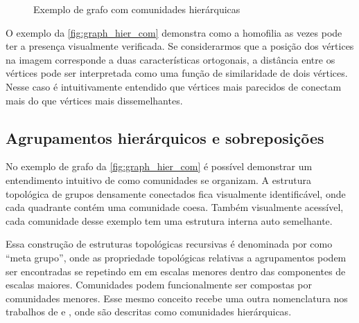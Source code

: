 \documentclass[notes.tex]{subfiles}
\begin{document}
\begin{figure}[htpb]
    \centering
    \caption{Exemplo de grafo com comunidades hierárquicas}\label{fig:graph_hier_com}
\end{figure}

O exemplo da \autoref{fig:graph_hier_com} demonstra como a homofilia as vezes pode ter a presença visualmente verificada.
Se considerarmos que a posição dos vértices na imagem corresponde a duas características ortogonais, a distância entre os vértices pode ser interpretada como uma função de similaridade de dois vértices.
Nesse caso é intuitivamente entendido que vértices mais parecidos de conectam mais do que vértices mais dissemelhantes.

\subsection{Agrupamentos hierárquicos e sobreposições}

No exemplo de grafo da \autoref{fig:graph_hier_com} é possível demonstrar um entendimento intuitivo de como comunidades se organizam.
A estrutura topológica de grupos densamente conectados fica visualmente identificável, onde cada quadrante contém uma comunidade coesa.
Também visualmente acessível, cada comunidade desse exemplo tem uma estrutura interna auto semelhante.

Essa construção de estruturas topológicas recursivas é denominada por  como ``meta grupo'', onde as propriedade topológicas relativas a agrupamentos podem ser encontradas se repetindo em em escalas menores dentro das componentes de escalas maiores.
Comunidades podem funcionalmente ser compostas por comunidades menores.
Esse mesmo conceito recebe uma outra nomenclatura nos trabalhos de  e , onde são descritas como comunidades hierárquicas.
\end{document}
